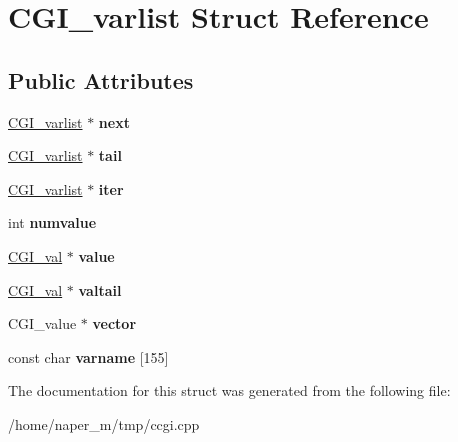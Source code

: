 \hypertarget{struct_c_g_i__varlist}{\section{C\-G\-I\-\_\-varlist Struct Reference}
\label{struct_c_g_i__varlist}
}
\subsection*{Public Attributes}
\begin{DoxyCompactItemize}
\item 
\hypertarget{struct_c_g_i__varlist_a24408a45c9c85229b36083a99b4c8396}{\hyperlink{struct_c_g_i__varlist}{C\-G\-I\-\_\-varlist} $\ast$ {\bfseries next}}\label{struct_c_g_i__varlist_a24408a45c9c85229b36083a99b4c8396}

\item 
\hypertarget{struct_c_g_i__varlist_a28e3fb2aeb4ad88dcc6e20c8dab140f2}{\hyperlink{struct_c_g_i__varlist}{C\-G\-I\-\_\-varlist} $\ast$ {\bfseries tail}}\label{struct_c_g_i__varlist_a28e3fb2aeb4ad88dcc6e20c8dab140f2}

\item 
\hypertarget{struct_c_g_i__varlist_a563ce824ff5f0d9c902792dabe80bcaf}{\hyperlink{struct_c_g_i__varlist}{C\-G\-I\-\_\-varlist} $\ast$ {\bfseries iter}}\label{struct_c_g_i__varlist_a563ce824ff5f0d9c902792dabe80bcaf}

\item 
\hypertarget{struct_c_g_i__varlist_a2187c0aa517dd64573bca5c464310579}{int {\bfseries numvalue}}\label{struct_c_g_i__varlist_a2187c0aa517dd64573bca5c464310579}

\item 
\hypertarget{struct_c_g_i__varlist_a14387773fe8d221bab7ca3d519a1584a}{\hyperlink{struct_c_g_i__val}{C\-G\-I\-\_\-val} $\ast$ {\bfseries value}}\label{struct_c_g_i__varlist_a14387773fe8d221bab7ca3d519a1584a}

\item 
\hypertarget{struct_c_g_i__varlist_a71575f8c031e40e14dd7d1ace89c53bf}{\hyperlink{struct_c_g_i__val}{C\-G\-I\-\_\-val} $\ast$ {\bfseries valtail}}\label{struct_c_g_i__varlist_a71575f8c031e40e14dd7d1ace89c53bf}

\item 
\hypertarget{struct_c_g_i__varlist_acbe8f24d5d0a16aaef33c92d4c3e8655}{C\-G\-I\-\_\-value $\ast$ {\bfseries vector}}\label{struct_c_g_i__varlist_acbe8f24d5d0a16aaef33c92d4c3e8655}

\item 
\hypertarget{struct_c_g_i__varlist_a54abd033517b64ac405113c6842ffd04}{const char {\bfseries varname} \mbox{[}155\mbox{]}}\label{struct_c_g_i__varlist_a54abd033517b64ac405113c6842ffd04}

\end{DoxyCompactItemize}


The documentation for this struct was generated from the following file\-:\begin{DoxyCompactItemize}
\item 
/home/naper\-\_\-m/tmp/ccgi.\-cpp\end{DoxyCompactItemize}
